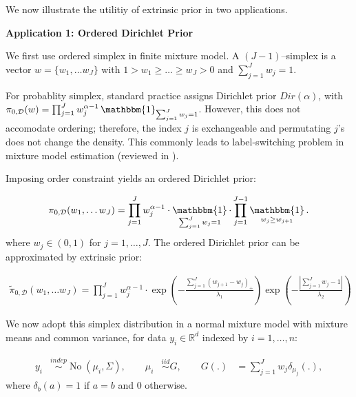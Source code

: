 \documentclass[10pt]{article}
\newcommand{\bb}[1]{\mathbb{#1}}
\newcommand{\mc}[1]{\mathcal{#1}}
\DeclareMathOperator{\No}{No}
\DeclareMathOperator{\1}{\mathbbm{1}}
\begin{document}
We now illustrate the utilitiy of extrinsic prior in two applications. 

{\bf Application 1: Ordered Dirichlet Prior}

We first use ordered simplex in finite mixture model. A $(J-1)$--simplex is a vector $w=\{w_1,\ldots w_J\}$ with $1> w_1 \ge \ldots \ge w_J > 0$ and $\sum_{j=1}^J w_j=1$.

For probablity simplex, standard practice assigns Dirichlet prior $Dir(\alpha)$, with $
\pi_{0, \mc D}(w) = \prod_{j=1}^J w_j^{\alpha-1} \1_{\sum_{j=1}^J w_j=1}$. However, this does not accomodate ordering; therefore, the index $j$ is exchangeable and permutating $j$'s does not change the density. This commonly leads to label-switching problem in mixture model estimation (reviewed in \cite{jasra2005markov}).

Imposing order constraint yields an ordered Dirichlet prior:

 \begin{equation}
\begin{aligned}
\label{ordered_dp_prior}
\pi_{0, \mc D}(w_1,\ldots w_J) = \prod_{j=1}^J w_j^{\alpha-1} \cdot \1_{\sum_{j=1}^J w_j=1} \cdot  \prod_{j=1}^{J-1}\1_{w_j \ge w_{j+1}}.
\end{aligned}
\end{equation}
where $w_j\in (0,1)$ for $j=1,\ldots,J$. The ordered Dirichlet prior can be approximated by extrinsic prior:


 \begin{equation*}
\begin{aligned}
\tilde\pi_{0, \mc D}(w_1,\ldots w_J) = \prod_{j=1}^J w_j^{\alpha-1} \cdot  \exp ( -  \frac{ \sum_{j=1}^J ( w_{j+1} - w_j )_+}{\lambda_1})
 \exp ( -  \frac{|{\sum_{j=1}^J w_j - 1}|}{\lambda_2})
\end{aligned}
\end{equation*}

We now adopt this simplex distribution in a normal mixture model with mixture means and common variance, for data $y_i\in \bb R^d$ indexed by $i=1,\ldots,n$:

\begin{equation*}
\begin{aligned}
y_i &\stackrel{indep}{\sim} \No(\mu_i,\Sigma),\qquad
\mu_i &\stackrel{iid}{\sim} G,\qquad
G(.) & = \sum_{j=1}^{J} w_j \delta_{\mu_j}(.),
\end{aligned}
\end{equation*}
where $\delta_{b}(a)=1$ if $a=b$ and $0$ otherwise.
\end{document}
